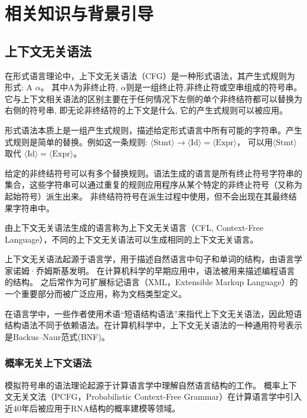 
\chapter{相关知识与背景引导}

\section{上下文无关语法}

在形式语言理论中，上下文无关语法（CFG）是一种形式语法，其产生式规则为形式: A \rightarrow $\alpha$。
其中A为非终止符, $\alpha$则是一组终止符,非终止符或空串组成的符号串。
它与上下文相关语法的区别主要在于任何情况下左侧的单个非终结符都可以替换为右侧的符号串, 即无论非终结符的上下文是什么, 它的产生式规则可以被应用。

形式语法本质上是一组产生式规则，描述给定形式语言中所有可能的字符串。产生式规则是简单的替换。例如这一条规则: $\displaystyle \langle {\text{Stmt}}\rangle \to \langle {\text{Id}}\rangle =\langle {\text{Expr}}\rangle$，
可以用$\displaystyle \langle {\text{Stmt}}\rangle$ 取代 $\langle {\text{Id}}\rangle =\langle {\text{Expr}}\rangle$。

给定的非终结符号可以有多个替换规则。语法生成的语言是所有终止符号字符串的集合，这些字符串可以通过重复的规则应用程序从某个特定的非终止符号（又称为起始符号）派生出来。
非终结符符号在派生过程中使用，但不会出现在其最终结果字符串中。

由上下文无关语法生成的语言称为上下文无关语言（CFL, Context-Free Language），不同的上下文无关语法可以生成相同的上下文无关语言。

上下文无关语法起源于语言学，用于描述自然语言中句子和单词的结构，由语言学家诺姆·乔姆斯基发明。
在计算机科学的早期应用中，语法被用来描述编程语言的结构。
之后常作为可扩展标记语言（XML，Extensible Markup Language）的一个重要部分而被广泛应用，称为文档类型定义\cite{hopcroft2001introduction}。


在语言学中，一些作者使用术语“短语结构语法”来指代上下文无关语法，因此短语结构语法不同于依赖语法。在计算机科学中，上下文无关语法的一种通用符号表示是Backus–Naur范式(BNF)。

\subsection{概率无关上下文语法}

模拟符号串的语法理论起源于计算语言学中理解自然语言结构的工作\cite{chomsky1956three,chomsky1959certain,lees1957syntactic}。
概率上下文无关文法（PCFG，Probabilistic Context-Free Grammar）在计算语言学中引入近40年后被应用于RNA结构的概率建模等领域\cite{sakakibara1994stochastic}。

